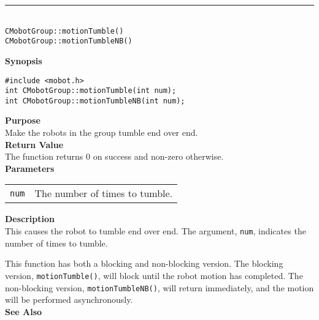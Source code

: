 \noindent
\vspace{5pt}
\rule{4.5in}{0.015in}\\
\noindent
{\LARGE \texttt{CMobotGroup::motionTumble()}}\\
{\LARGE \texttt{CMobotGroup::motionTumbleNB()}}\\
{}

\noindent
{\bf Synopsis}
\vspace{-8pt}
\begin{verbatim}
#include <mobot.h>
int CMobotGroup::motionTumble(int num);
int CMobotGroup::motionTumbleNB(int num);
\end{verbatim}

\noindent
{\bf Purpose}\\
Make the robots in the group tumble end over end.\\

\noindent
{\bf Return Value}\\
The function returns 0 on success and non-zero otherwise.\\

\noindent
{\bf Parameters}\\
\vspace{-0.1in}
\begin{description}
\item               
\begin{tabular}{p{10 mm}p{145 mm}}
\texttt{num} & The number of times to tumble. \\
\end{tabular}
\end{description}

\noindent
{\bf Description}\\
This causes the robot to tumble end over end. The argument, \texttt{num},
indicates the number of times to tumble.

This function has both a blocking and non-blocking version.
The blocking version, \texttt{motionTumble()}, will block until the
robot motion has completed. The non-blocking version, \texttt{motionTumbleNB()},
will return immediately, and the motion will be performed asynchronously.\\

\noindent
{\bf See Also}\\

